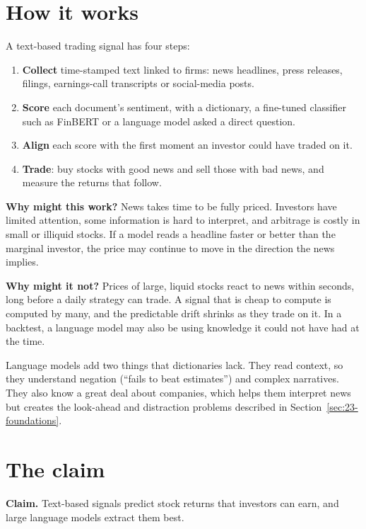 \section{How it works}
\label{sec:23-how}

A text-based trading signal has four steps:

\begin{enumerate}
  \item \textbf{Collect} time-stamped text linked to firms: news headlines, press releases, filings, earnings-call transcripts or social-media posts.
  \item \textbf{Score} each document's sentiment, with a dictionary, a fine-tuned classifier such as FinBERT or a language model asked a direct question.
  \item \textbf{Align} each score with the first moment an investor could have traded on it.
  \item \textbf{Trade}: buy stocks with good news and sell those with bad news, and measure the returns that follow.
\end{enumerate}

\textbf{Why might this work?} News takes time to be fully priced. Investors have limited attention, some information is hard to interpret, and arbitrage is costly in small or illiquid stocks. If a model reads a headline faster or better than the marginal investor, the price may continue to move in the direction the news implies.

\textbf{Why might it not?} Prices of large, liquid stocks react to news within seconds, long before a daily strategy can trade. A signal that is cheap to compute is computed by many, and the predictable drift shrinks as they trade on it. In a backtest, a language model may also be using knowledge it could not have had at the time.

Language models add two things that dictionaries lack. They read context, so they understand negation (``fails to beat estimates'') and complex narratives. They also know a great deal about companies, which helps them interpret news but creates the look-ahead and distraction problems described in Section~\ref{sec:23-foundations}.

\section{The claim}
\label{sec:23-claim}

\begin{callout}
\textbf{Claim.} Text-based signals predict stock returns that investors can earn, and large language models extract them best.
\end{callout}

